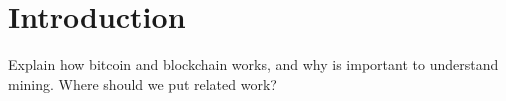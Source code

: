 
\section{Introduction}
\label{sec-intro}

Explain how bitcoin and blockchain works, and why is important to understand mining. Where should we put related work?